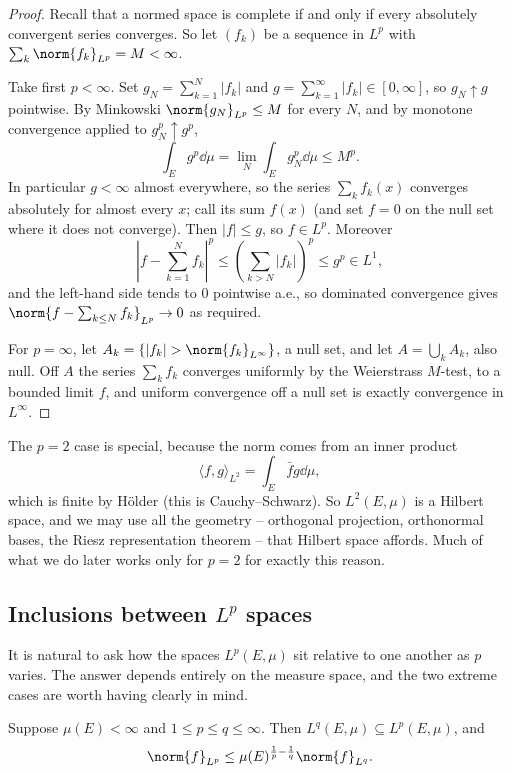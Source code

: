 \documentclass[a4paper]{scrartcl}
\newcommand{\ip}[2]{\langle #1, #2 \rangle}
\begin{document}
\begin{proof}
	Recall that a normed space is complete if and only if every absolutely convergent series converges. So let $(f_k)$ be a sequence in $L^p$ with $\sum_k \norm{f_k}_{L^p} = M < \infty$.

	Take first $p < \infty$. Set $g_N = \sum_{k=1}^N |f_k|$ and $g = \sum_{k=1}^\infty |f_k| \in [0,\infty]$, so $g_N \uparrow g$ pointwise. By Minkowski $\norm{g_N}_{L^p} \le M$ for every $N$, and by monotone convergence applied to $g_N^p \uparrow g^p$,
	$$\int_E g^p \dd \mu = \lim_N \int_E g_N^p \dd\mu \le M^p.$$
	In particular $g < \infty$ almost everywhere, so the series $\sum_k f_k(x)$ converges absolutely for almost every $x$; call its sum $f(x)$ (and set $f = 0$ on the null set where it does not converge). Then $|f| \le g$, so $f \in L^p$. Moreover
	$$\left| f - \sum_{k=1}^N f_k \right|^p \le \left( \sum_{k > N} |f_k|\right)^p \le g^p \in L^1,$$
	and the left-hand side tends to $0$ pointwise a.e., so dominated convergence gives $\norm{f - \sum_{k \le N} f_k}_{L^p} \to 0$ as required.

	For $p = \infty$, let $A_k = \{|f_k| > \norm{f_k}_{L^\infty}\}$, a null set, and let $A = \bigcup_k A_k$, also null. Off $A$ the series $\sum_k f_k$ converges uniformly by the Weierstrass $M$-test, to a bounded limit $f$, and uniform convergence off a null set is exactly convergence in $L^\infty$.
\end{proof}

The $p = 2$ case is special, because the norm comes from an inner product
$$\ip{f}{g}_{L^2} = \int_E \bar f g \dd \mu,$$
which is finite by H\"older (this is Cauchy--Schwarz). So $L^2(E,\mu)$ is a Hilbert space, and we may use all the geometry -- orthogonal projection, orthonormal bases, the Riesz representation theorem -- that Hilbert space affords. Much of what we do later works only for $p = 2$ for exactly this reason.

\subsection{Inclusions between \texorpdfstring{$L^p$}{Lp} spaces}

It is natural to ask how the spaces $L^p(E,\mu)$ sit relative to one another as $p$ varies. The answer depends entirely on the measure space, and the two extreme cases are worth having clearly in mind.

\begin{proposition}\label{prop:finiteinclusion}
	Suppose $\mu(E) < \infty$ and $1 \le p \le q \le \infty$. Then $L^q(E,\mu) \subseteq L^p(E,\mu)$, and
	$$\norm{f}_{L^p} \le \mu(E)^{\frac 1p - \frac 1q} \norm{f}_{L^q}.$$
\end{proposition}
\end{document}
